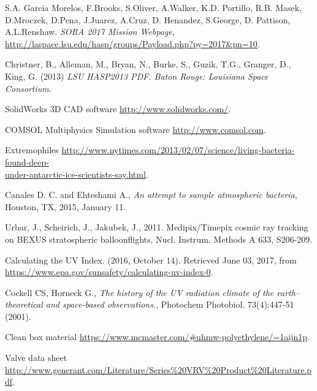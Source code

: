 \newpage

\begin{thebibliography}{9}
S.A. Garcia Morelos, F.Brooks, S.Oliver, A.Walker, K.D. Portillo, R.B. Masek, D.Mroczek, D.Pena, J.Juarez, A.Cruz, D. Henandez, S.George, D. Pattison, A.L.Renshaw. \textit{SORA 2017 Mission Webpage}, \url{http://laspace.lsu.edu/hasp/groups/Payload.php?py=2017&pn=10}.

  Christner, B., Alleman, M., Bryan, N., Burke, S., Guzik, T.G., Granger, D., King, G. (2013) \textit{LSU HASP2013 PDF. Baton Rouge: Louisiana Space Consortium}.

   SolidWorks 3D CAD software \url{http://www.solidworks.com/}.
  
   COMSOL Multiphysics Simulation software \url{http://www.comsol.com}.

  Extremophiles \href{http://www.nytimes.com/2013/02/07/science/living-bacteria-found-deep-under-antarctic-ice-scientists-say.html}{http://www.nytimes.com/2013/02/07/science/living-bacteria-found-deep-\\under-antarctic-ice-scientists-say.html}.

 Canales D. C. and Ehteshami A., \textit{An attempt to sample atmospheric bacteria}, Houston, TX, 2015, January 11.

Urbar, J., Scheirich, J., Jakubek, J., 2011. Medipix/Timepix cosmic ray tracking on BEXUS stratospheric balloonflights. Nucl. Instrum. Methods A 633, S206-209.
	
  Calculating the UV Index. (2016, October 14). Retrieved June 03, 2017, from \url{https://www.epa.gov/sunsafety/calculating-uv-index-0}.

  Cockell CS, Horneck G., \textit{The history of the UV radiation climate of the earth--theoretical and space-based observations.}, Photochem Photobiol. 73(4):447-51 (2001).

Clean box material \url{https://www.mcmaster.com/\#uhmw-polyethylene/=1aijn1p}.

Valve data sheet \url{http://www.generant.com/Literature/Series\%20VRV\%20Product\%20Literature.pdf}.


\end{thebibliography}

